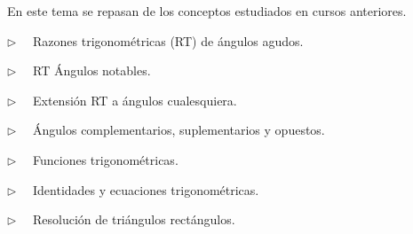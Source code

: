 \begin{adjustwidth}{30pt}{30pt}
\begin{cuadro-gris}

	\begin{multicols}{2}
	En este tema se repasan de los conceptos estudiados en cursos anteriores.
	
	$\triangleright \quad$  Razones trigonométricas (RT) de ángulos agudos.
	
	$\triangleright \quad$  RT Ángulos notables.
	
	$\triangleright \quad$  Extensión RT a ángulos cualesquiera.
	
	$\triangleright \quad$  Ángulos complementarios, suplementarios y opuestos.
	
	$\triangleright \quad$ Funciones trigonométricas.
	
	$\triangleright \quad$ Identidades y ecuaciones trigonométricas.
	
	$\triangleright \quad$ Resolución de triángulos rectángulos.
	\end{multicols}
	
\end{cuadro-gris}
\end{adjustwidth}

\vspace{5mm}

